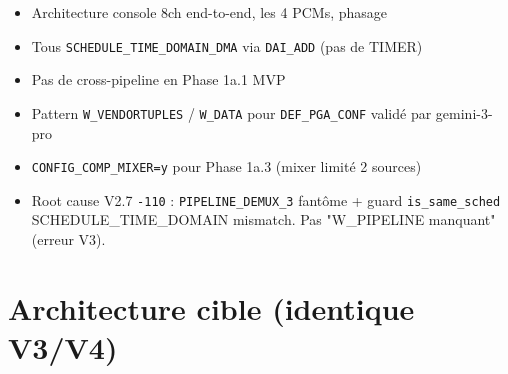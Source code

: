 \documentclass[11pt,a4paper]{article}
\begin{document}
\begin{itemize}[leftmargin=*, itemsep=1pt]
  \item Architecture console 8ch end-to-end, les 4 PCMs, phasage
  \item Tous \texttt{SCHEDULE\_TIME\_DOMAIN\_DMA} via \texttt{DAI\_ADD} (pas de TIMER)
  \item Pas de cross-pipeline en Phase 1a.1 MVP
  \item Pattern \texttt{W\_VENDORTUPLES} / \texttt{W\_DATA} pour \texttt{DEF\_PGA\_CONF} validé par gemini-3-pro
  \item \texttt{CONFIG\_COMP\_MIXER=y} pour Phase 1a.3 (mixer limité 2 sources)
  \item Root cause V2.7 \texttt{-110} : \texttt{PIPELINE\_DEMUX\_3} fantôme + guard \texttt{is\_same\_sched} SCHEDULE\_TIME\_DOMAIN mismatch. Pas "W\_PIPELINE manquant" (erreur V3).
\end{itemize}

\section{Architecture cible (identique V3/V4)}
\end{document}

